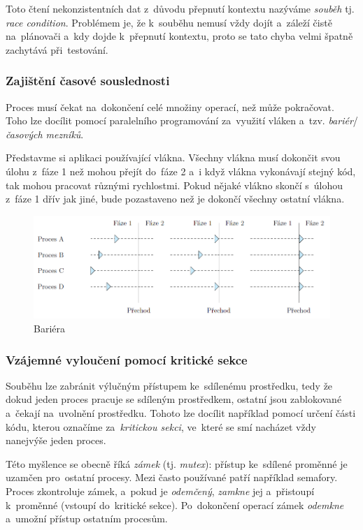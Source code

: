 Toto čtení nekonzistentních dat z~důvodu přepnutí kontextu nazýváme \emph{souběh} tj. \emph{race condition}. Problémem je, že k~souběhu nemusí vždy dojít a~záleží čistě na~plánovači a~kdy dojde k~přepnutí kontextu, proto se tato chyba velmi špatně zachytává při~testování.

\subsubsection{Zajištění časové souslednosti}

Proces musí čekat na~dokončení celé množiny operací, než může pokračovat. Toho lze docílit pomocí paralelního programování za~využití vláken a~tzv. \emph{bariér}/\emph{časových mezníků}.

Představme si aplikaci používající vlákna. Všechny vlákna musí dokončit svou úlohu z~fáze 1 než mohou přejít do~fáze 2 a~i když vlákna vykonávají stejný kód, tak mohou pracovat různými rychlostmi. Pokud nějaké vlákno skončí s~úlohou z~fáze 1 dřív jak jiné, bude pozastaveno než je dokončí všechny ostatní vlákna.

\begin{figure}[ht]
	\centering
	\includegraphics[width=\textwidth]{images/proc_barrier.png}
	\caption{Bariéra}
	\label{proc_barrier}
\end{figure}

\subsubsection{Vzájemné vyloučení pomocí kritické sekce}

Souběhu lze zabránit výlučným přístupem ke~sdílenému prostředku, tedy že dokud jeden proces pracuje se sdíleným prostředkem, ostatní jsou zablokované a~čekají na~uvolnění prostředku. Tohoto lze docílit například pomocí určení části kódu, kterou označíme za~\emph{kritickou sekci}, ve~které se smí nacházet vždy nanejvýše jeden proces. 

Této myšlence se obecně říká \emph{zámek} (tj. \emph{mutex}): přístup ke~sdílené proměnné je uzamčen pro~ostatní procesy. Mezi často používané patří například semafory. Proces zkontroluje zámek, a~pokud je \emph{odemčený}, \emph{zamkne} jej a~přistoupí k~proměnné (vstoupí do~kritické sekce). Po~dokončení operací zámek \emph{odemkne} a~umožní přístup ostatním procesům. 

